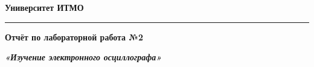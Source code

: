 \documentclass[12pt]{article}
\begin{document}
\pagestyle{empty}
\begin{center}
\large{\textbf{Университет ИТМО}}
\end{center}
\rule{550pt}{1pt}
\par\bigskip\par\bigskip\par\bigskip\par\bigskip\par\bigskip\par\bigskip\par\bigskip\par\bigskip\par\bigskip\par\bigskip\par\bigskip\par\bigskip\par\bigskip\par\bigskip\par\bigskip\par\bigskip\par\bigskip
\par\bigskip\par\bigskip\par\bigskip\par\bigskip\par\bigskip\par\bigskip
\begin{center}
\Large
\textbf{Отчёт по лабораторной работа №2}

\textbf{\textit{«Изучение электронного осциллографа»}}


\end{center}
\par\bigskip\par\bigskip\par\bigskip\par\bigskip\par\bigskip\par\bigskip\par\bigskip\par\bigskip\par\bigskip\par\bigskip\par\bigskip\par\bigskip\par\bigskip\par\bigskip\par\bigskip
\end{document}
